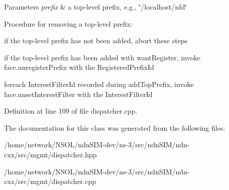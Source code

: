 \begin{DoxyParams}{Parameters}
{\em prefix} & a top-\/level prefix, e.\+g., \char`\"{}/localhost/nfd\char`\"{}\\
\hline
\end{DoxyParams}
Procedure for removing a top-\/level prefix\+:
\begin{DoxyEnumerate}
\item if the top-\/level prefix has not been added, abort these steps
\item if the top-\/level prefix has been added with want\+Register, invoke face.\+unregister\+Prefix with the Registered\+Prefix\+Id
\item foreach Interest\+Filter\+Id recorded during add\+Top\+Prefix, invoke face.\+unset\+Interest\+Filter with the Interest\+Filter\+Id 
\end{DoxyEnumerate}

Definition at line 109 of file dispatcher.\+cpp.



The documentation for this class was generated from the following files\+:\begin{DoxyCompactItemize}
\item 
/home/network/\+N\+S\+O\+L/ndn\+S\+I\+M-\/dev/ns-\/3/src/ndn\+S\+I\+M/ndn-\/cxx/src/mgmt/dispatcher.\+hpp\item 
/home/network/\+N\+S\+O\+L/ndn\+S\+I\+M-\/dev/ns-\/3/src/ndn\+S\+I\+M/ndn-\/cxx/src/mgmt/dispatcher.\+cpp\end{DoxyCompactItemize}

